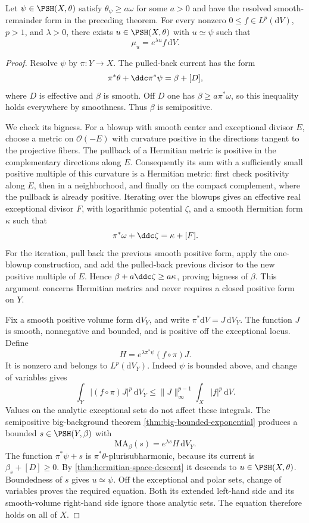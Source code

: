 \begin{lemma}\label{lem:big-resolved-equation}
Let $\psi\in\PSH(X,\theta)$ satisfy $\theta_\psi\geq a\omega$ for some $a>0$ and have the resolved smooth-remainder form in the preceding theorem. For every nonzero $0\leq f\in L^p(\mathrm{d}V)$, $p>1$, and $\lambda>0$, there exists $u\in\PSH(X,\theta)$ with $u\simeq\psi$ such that
\[
 \mu_u=e^{\lambda u}f\,\mathrm{d}V.
\]
\end{lemma}
\begin{proof}
Resolve $\psi$ by $\pi:Y\to X$. The pulled-back current has the form
\[
 \pi^*\theta+\ddc\pi^*\psi=\beta+[D],
\]
where $D$ is effective and $\beta$ is smooth. Off $D$ one has $\beta\geq a\pi^*\omega$, so this inequality holds everywhere by smoothness. Thus $\beta$ is semipositive.

We check its bigness. For a blowup with smooth center and exceptional divisor $E$, choose a metric on $\mathcal O(-E)$ with curvature positive in the directions tangent to the projective fibers. The pullback of a Hermitian metric is positive in the complementary directions along $E$. Consequently its sum with a sufficiently small positive multiple of this curvature is a Hermitian metric: first check positivity along $E$, then in a neighborhood, and finally on the compact complement, where the pullback is already positive. Iterating over the blowups gives an effective real exceptional divisor $F$, with logarithmic potential $\zeta$, and a smooth Hermitian form $\kappa$ such that
\[
 \pi^*\omega+\ddc\zeta=\kappa+[F].
\]
For the iteration, pull back the previous smooth positive form, apply the one-blowup construction, and add the pulled-back previous divisor to the new positive multiple of $E$. Hence
$\beta+a\ddc\zeta\geq a\kappa$, proving bigness of $\beta$. This argument concerns Hermitian metrics and never requires a closed positive form on $Y$.

Fix a smooth positive volume form $\mathrm{d}V_Y$, and write $\pi^*\mathrm{d}V=J\,\mathrm{d}V_Y$. The function $J$ is smooth, nonnegative and bounded, and is positive off the exceptional locus. Define
\[
 H=e^{\lambda\pi^*\psi}(f\circ\pi)J.
\]
It is nonzero and belongs to $L^p(\mathrm{d}V_Y)$. Indeed $\psi$ is bounded above, and change of variables gives
\[
 \int_Y|(f\circ\pi)J|^p\,\mathrm{d}V_Y
 \leq\|J\|_\infty^{p-1}\int_X|f|^p\,\mathrm{d}V.
\]
Values on the analytic exceptional sets do not affect these integrals. The semipositive big-background theorem \cref{thm:big-bounded-exponential} produces a bounded $s\in\PSH(Y,\beta)$ with
\[
 \mathrm{MA}_\beta(s)=e^{\lambda s}H\,\mathrm{d}V_Y.
\]
The function $\pi^*\psi+s$ is $\pi^*\theta$-plurisubharmonic, because its current is $\beta_s+[D]\geq0$. By \cref{thm:hermitian-space-descent} it descends to $u\in\PSH(X,\theta)$. Boundedness of $s$ gives $u\simeq\psi$. Off the exceptional and polar sets, change of variables proves the required equation. Both its extended left-hand side and its smooth-volume right-hand side ignore those analytic sets. The equation therefore holds on all of $X$.
\end{proof}

